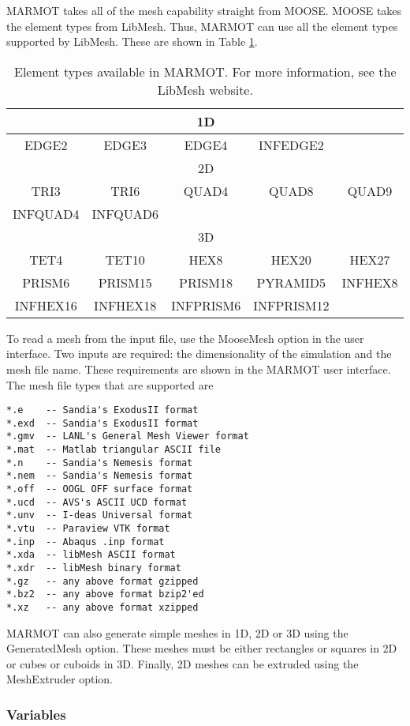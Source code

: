 \documentclass[letter,12pt,fleqn]{article}
\begin{document}
MARMOT takes all of the mesh capability straight from MOOSE. MOOSE takes the element types from LibMesh. Thus, MARMOT can use all the element types supported by LibMesh. These are shown in Table \ref{table:elements}.
\begin{table}[tb]
\begin{tabular} {ccccc}
\hline
& & 1D & & \\
\hline
EDGE2 & EDGE3 & EDGE4 & INFEDGE2 & \\
\hline
& & 2D & &\\
\hline
TRI3 & TRI6 & QUAD4 & QUAD8 & QUAD9 \\
INFQUAD4 & INFQUAD6 & & & \\
\hline
& & 3D & &\\
\hline
TET4 & TET10 & HEX8 & HEX20 & HEX27 \\
PRISM6 & PRISM15 & PRISM18 & PYRAMID5 & INFHEX8 \\
INFHEX16  & INFHEX18  & INFPRISM6 & INFPRISM12 & \\
\end{tabular}
\caption{Element types available in MARMOT. For more information, see the LibMesh website.}
\label{table:elements}
\end{table}

To read a mesh from the input file, use the MooseMesh option in the user interface. Two inputs are required: the dimensionality of the simulation and the mesh file name. These requirements are shown in the MARMOT user interface. The mesh file types that are supported are
\begin{verbatim}
*.e    -- Sandia's ExodusII format
*.exd  -- Sandia's ExodusII format
*.gmv  -- LANL's General Mesh Viewer format
*.mat  -- Matlab triangular ASCII file
*.n    -- Sandia's Nemesis format
*.nem  -- Sandia's Nemesis format
*.off  -- OOGL OFF surface format
*.ucd  -- AVS's ASCII UCD format
*.unv  -- I-deas Universal format
*.vtu  -- Paraview VTK format
*.inp  -- Abaqus .inp format
*.xda  -- libMesh ASCII format
*.xdr  -- libMesh binary format
*.gz   -- any above format gzipped
*.bz2  -- any above format bzip2'ed
*.xz   -- any above format xzipped
\end{verbatim}

MARMOT can also generate simple meshes in 1D, 2D or 3D using the GeneratedMesh option. These meshes must be either rectangles or squares in 2D or cubes or cuboids in 3D.  Finally, 2D meshes can be extruded using the MeshExtruder option. 

\subsubsection{Variables}
\end{document}
